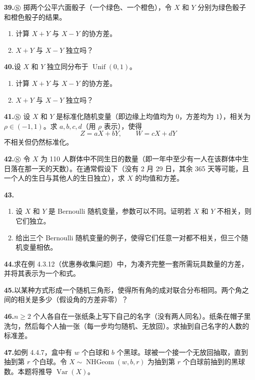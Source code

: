 \documentclass[UTF8,12pt,a4paper,fontset=fandol]{ctexart}
\begin{document}
\noindent\textbf{39.}\quad $\circledS$ 掷两个公平六面骰子（一个绿色、一个橙色），令 $X$ 和 $Y$ 分别为绿色骰子和橙色骰子的结果。
\begin{enumerate}
  \item[(a)] 计算 $X+Y$ 与 $X-Y$ 的协方差。
  \item[(b)] $X+Y$ 与 $X-Y$ 独立吗？
\end{enumerate}

\noindent\textbf{40.}\quad 设 $X$ 和 $Y$ 独立同分布于 $\operatorname{Unif}(0,1)$。
\begin{enumerate}
  \item[(a)] 计算 $X+Y$ 与 $X-Y$ 的协方差。
  \item[(b)] $X+Y$ 与 $X-Y$ 独立吗？
\end{enumerate}

\noindent\textbf{41.}\quad $\circledS$ 设 $X$ 和 $Y$ 是标准化随机变量（即边缘上均值均为 $0$，方差均为 $1$），相关为 $\rho\in(-1,1)$。求 $a,b,c,d$（用 $\rho$ 表示），使得
\[
  Z=aX+bY,\qquad W=cX+dY
\]
不相关但仍然标准化。

\noindent\textbf{42.}\quad $\circledS$ 令 $X$ 为 110 人群体中不同生日的数量（即一年中至少有一人在该群体中生日落在那一天的天数）。在通常假设下（没有 2 月 29 日，其余 365 天等可能，且一个人的生日与其他人的生日独立），求 $X$ 的均值和方差。

\noindent\textbf{43.}\quad
\begin{enumerate}
  \item[(a)] 设 $X$ 和 $Y$ 是 Bernoulli 随机变量，参数可以不同。证明若 $X$ 和 $Y$ 不相关，则它们独立。
  \item[(b)] 给出三个 Bernoulli 随机变量的例子，使得它们任意一对都不相关，但三个随机变量相依。
\end{enumerate}

\noindent\textbf{44.}\quad 求在例 4.3.12（优惠券收集问题）中，为凑齐完整一套所需玩具数量的方差，并将其表示为一个和式。

\noindent\textbf{45.}\quad 以某种方式形成一个随机三角形，使得所有角的成对联合分布相同。两个角之间的相关是多少（假设角的方差非零）？

\noindent\textbf{46.}\quad $n\ge 2$ 个人各自在一张纸条上写下自己的名字（没有两人同名）。纸条在帽子里洗匀，然后每个人抽一张（每一步均匀随机、无放回）。求抽到自己名字的人数的标准差。

\noindent\textbf{47.}\quad 如例 4.4.7，盒中有 $w$ 个白球和 $b$ 个黑球。球被一个接一个无放回抽取，直到抽到第 $r$ 个白球。令 $X\sim \operatorname{NHGeom}(w,b,r)$ 为抽到第 $r$ 个白球前抽到的黑球数。本题将推导 $\operatorname{Var}(X)$。
\end{document}
